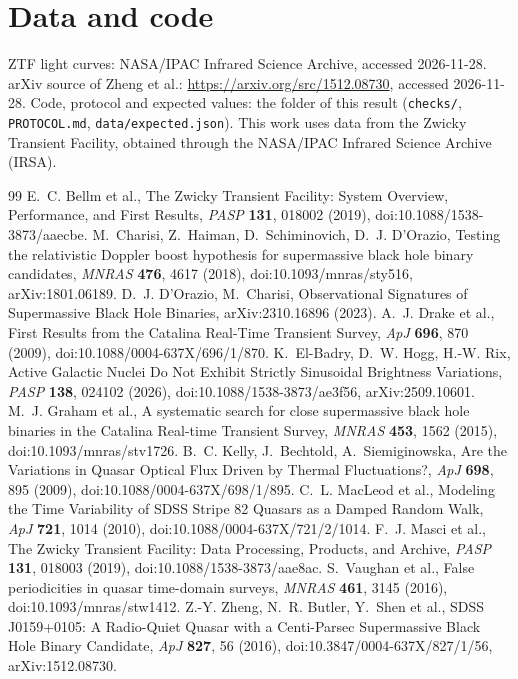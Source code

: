 \documentclass[11pt]{article}
\begin{document}
\section*{Data and code}
ZTF light curves: NASA/IPAC Infrared Science Archive, accessed 2026-11-28. arXiv source of Zheng et al.: \url{https://arxiv.org/src/1512.08730}, accessed 2026-11-28. Code, protocol and expected values: the folder of this result (\texttt{checks/}, \texttt{PROTOCOL.md}, \texttt{data/expected.json}). This work uses data from the Zwicky Transient Facility, obtained through the NASA/IPAC Infrared Science Archive (IRSA).

\begin{thebibliography}{99}
 E.~C. Bellm et al., The Zwicky Transient Facility: System Overview, Performance, and First Results, \emph{PASP} \textbf{131}, 018002 (2019), doi:10.1088/1538-3873/aaecbe.
 M.~Charisi, Z.~Haiman, D.~Schiminovich, D.~J. D'Orazio, Testing the relativistic Doppler boost hypothesis for supermassive black hole binary candidates, \emph{MNRAS} \textbf{476}, 4617 (2018), doi:10.1093/mnras/sty516, arXiv:1801.06189.
 D.~J. D'Orazio, M.~Charisi, Observational Signatures of Supermassive Black Hole Binaries, arXiv:2310.16896 (2023).
 A.~J. Drake et al., First Results from the Catalina Real-Time Transient Survey, \emph{ApJ} \textbf{696}, 870 (2009), doi:10.1088/0004-637X/696/1/870.
 K.~El-Badry, D.~W. Hogg, H.-W. Rix, Active Galactic Nuclei Do Not Exhibit Strictly Sinusoidal Brightness Variations, \emph{PASP} \textbf{138}, 024102 (2026), doi:10.1088/1538-3873/ae3f56, arXiv:2509.10601.
 M.~J. Graham et al., A systematic search for close supermassive black hole binaries in the Catalina Real-time Transient Survey, \emph{MNRAS} \textbf{453}, 1562 (2015), doi:10.1093/mnras/stv1726.
 B.~C. Kelly, J.~Bechtold, A.~Siemiginowska, Are the Variations in Quasar Optical Flux Driven by Thermal Fluctuations?, \emph{ApJ} \textbf{698}, 895 (2009), doi:10.1088/0004-637X/698/1/895.
 C.~L. MacLeod et al., Modeling the Time Variability of SDSS Stripe 82 Quasars as a Damped Random Walk, \emph{ApJ} \textbf{721}, 1014 (2010), doi:10.1088/0004-637X/721/2/1014.
 F.~J. Masci et al., The Zwicky Transient Facility: Data Processing, Products, and Archive, \emph{PASP} \textbf{131}, 018003 (2019), doi:10.1088/1538-3873/aae8ac.
 S.~Vaughan et al., False periodicities in quasar time-domain surveys, \emph{MNRAS} \textbf{461}, 3145 (2016), doi:10.1093/mnras/stw1412.
 Z.-Y. Zheng, N.~R. Butler, Y.~Shen et al., SDSS J0159+0105: A Radio-Quiet Quasar with a Centi-Parsec Supermassive Black Hole Binary Candidate, \emph{ApJ} \textbf{827}, 56 (2016), doi:10.3847/0004-637X/827/1/56, arXiv:1512.08730.
\end{thebibliography}
\end{document}
